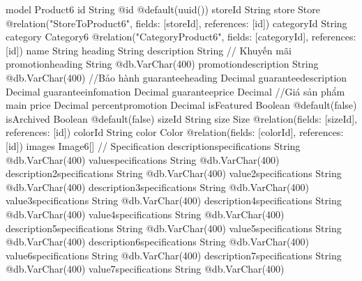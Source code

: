 model Product6 {
  id                           String                         @id @default(uuid())
  storeId                      String
  store                        Store                          @relation("StoreToProduct6", fields: [storeId], references: [id])
  categoryId                   String
  category                     Category6                      @relation("CategoryProduct6", fields: [categoryId], references: [id])
  name                         String
  heading                      String
  description                  String
  // Khuyến mãi
  promotionheading             String                         @db.VarChar(400)
  promotiondescription         String                         @db.VarChar(400)
  //Bảo hành
  guaranteeheading             Decimal
  guaranteedescription         Decimal
  guaranteeinfomation          Decimal
  guaranteeprice               Decimal
  //Giá sản phẩm main
  price                        Decimal
  percentpromotion             Decimal
  isFeatured                   Boolean                        @default(false)
  isArchived                   Boolean                        @default(false)
  sizeId                       String
  size                         Size                           @relation(fields: [sizeId], references: [id])
  colorId                      String
  color                        Color                          @relation(fields: [colorId], references: [id])
  images                       Image6[]
  // Specification
  descriptionspecifications    String                         @db.VarChar(400)
  valuespecifications          String                         @db.VarChar(400)
  description2specifications   String                         @db.VarChar(400)
  value2specifications         String                         @db.VarChar(400)
  description3specifications   String                         @db.VarChar(400)
  value3specifications         String                         @db.VarChar(400)
  description4specifications   String                         @db.VarChar(400)
  value4specifications         String                         @db.VarChar(400)
  description5specifications   String                         @db.VarChar(400)
  value5specifications         String                         @db.VarChar(400)
  description6specifications   String                         @db.VarChar(400)
  value6specifications         String                         @db.VarChar(400)
  description7specifications   String                         @db.VarChar(400)
  value7specifications         String                         @db.VarChar(400)
}
